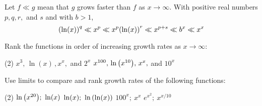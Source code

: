 \documentclass[mathNotesPreamble]{subfiles}
\begin{document}
\begin{thmBox*}
  Let $f\ll g$ mean that $g$ grows faster than $f$ as $x\to\infty$. With positive real numbers $p,q,r,$ and $s$ and with $b>1$,
    \[{\left(\ln(x)\right)}^q\ll x^p\ll x^p{\left(\ln(x)\right)}^r\ll x^{p+s}\ll b^x\ll x^x\]
\end{thmBox*}

\begin{ex*}
  Rank the functions in order of increasing growth rates as $x\to\infty$:
\end{ex*}
\begin{tasks}[after-item-skip=\stretch{1}, label=~](2)
  \task $x^3,\,\ln(x)\,,x^x,$ and $2^x$
  \task $x^{100},\,\ln{\left(x^{10}\right)},\,x^x,$ and $10^x$
\end{tasks}

\begin{ex*}
  Use limits to compare and rank growth rates of the following functions:
\end{ex*}
\begin{tasks}[after-item-skip=\stretch{1}, label=~](2)
  \task $\ln{\left(x^{20}\right)};\ \ln(x)$
  \task $\ln(x);\ \ln{\left(\ln(x)\right)}$
  \task $100^x;\ x^x$
  \task $e^{x^2};\ x^{x/10}$
\end{tasks}
\pagebreak
\end{document}
